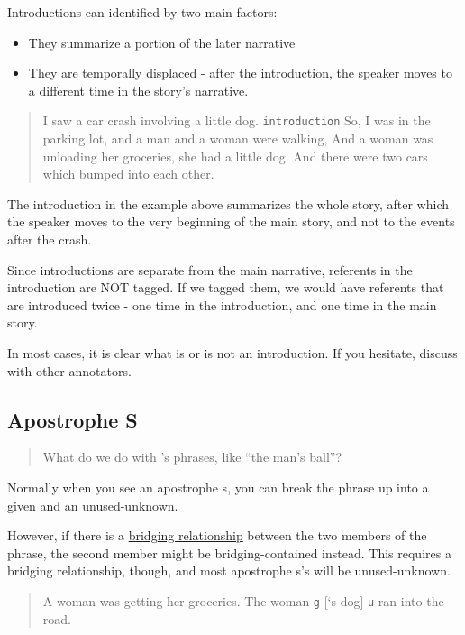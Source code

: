 \documentclass[
]{book}
\providecommand{\tightlist}{%
  \setlength{\itemsep}{0pt}\setlength{\parskip}{0pt}}
\begin{document}
Introductions can identified by two main factors:

\begin{itemize}
\tightlist
\item
  They summarize a portion of the later narrative
\item
  They are temporally displaced - after the introduction,
  the speaker moves to a different time in the story's narrative.
\end{itemize}

\begin{quote}
I saw a car crash involving a little dog. \texttt{introduction}
So, I was in the parking lot, and a man and a woman were walking,
And a woman was unloading her groceries, she had a little dog.
And there were two cars which bumped into each other.
\end{quote}

The introduction in the example above summarizes the whole story,
after which the speaker moves to the very beginning of the main story,
and not to the events after the crash.

Since introductions are separate from the main narrative,
referents in the introduction are NOT tagged. If we tagged them,
we would have referents that are introduced twice - one time in the introduction,
and one time in the main story.

In most cases, it is clear what is or is not an introduction.
If you hesitate, discuss with other annotators.

\hypertarget{apostrophe-s}{%
\subsection{Apostrophe S}\label{apostrophe-s}}

\begin{quote}
What do we do with 's phrases, like ``the man's ball''?
\end{quote}

Normally when you see an apostrophe s, you can break the phrase up into a given and an unused-unknown.

However, if there is a \protect\hyperlink{bridging-relationships}{bridging relationship} between the two members of the phrase, the second member might be bridging-contained instead.
This requires a bridging relationship, though, and most apostrophe s's will be unused-unknown.

\begin{quote}
A woman was getting her groceries.
The woman \texttt{g} {[}`s dog{]} \texttt{u} ran into the road.
\end{quote}
\end{document}
